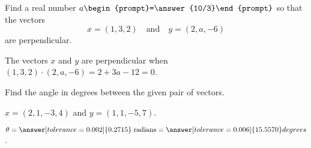 \documentclass{ximera}
\begin{document}



\problemlabel

\begin{exercise} \label{c1.4.2}
Find a real number $a\begin{prompt}=\answer{10/3}\end{prompt}$ so that the vectors
\[
x = (1,3,2) \quad\mbox{and}\quad y = (2,a,-6)
\]
are perpendicular.
\begin{hint}
  The vectors $x$ and $y$ are perpendicular when
$(1,3,2) \cdot (2,a,-6) = 2 + 3a - 12 = 0$.
\end{hint}

\end{exercise}





\matlabproblemlabel

\noindent Find the angle in degrees between the given pair of vectors.

\begin{computerExercise} \label{c1.4.6a}
$x=(2,1,-3,4)$ and $y=(1,1,-5,7)$.


\begin{solution}
\ans $\theta =
 \; \mbox{radians} =  degrees$.

\end{solution}

\end{computerExercise}


\end{document}
